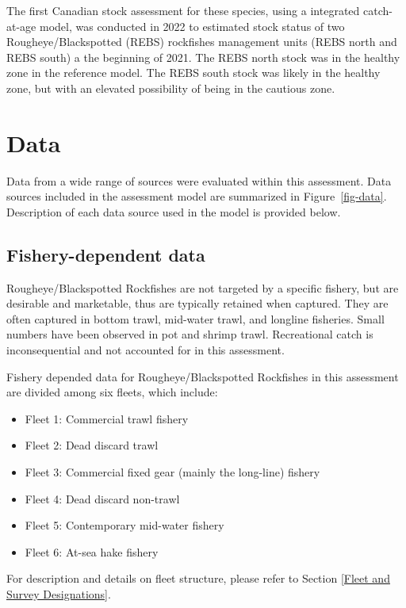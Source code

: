 \documentclass[
]{scrartcl}
\providecommand{\tightlist}{%
  \setlength{\itemsep}{0pt}\setlength{\parskip}{0pt}}\usepackage{longtable,booktabs,array}
\begin{document}
The first Canadian stock assessment for these species, using a
integrated catch-at-age model, was conducted in 2022 to estimated stock
status of two Rougheye/Blackspotted (REBS) rockfishes management units
(REBS north and REBS south) a the beginning of 2021. The REBS north
stock was in the healthy zone in the reference model. The REBS south
stock was likely in the healthy zone, but with an elevated possibility
of being in the cautious zone.

\newpage{}

\section{Data}\label{data}

Data from a wide range of sources were evaluated within this assessment.
Data sources included in the assessment model are summarized in
Figure~\ref{fig-data}. Description of each data source used in the model
is provided below.

\subsection{Fishery-dependent data}\label{fishery-dependent-data}

Rougheye/Blackspotted Rockfishes are not targeted by a specific fishery,
but are desirable and marketable, thus are typically retained when
captured. They are often captured in bottom trawl, mid-water trawl, and
longline fisheries. Small numbers have been observed in pot and shrimp
trawl. Recreational catch is inconsequential and not accounted for in
this assessment.

Fishery depended data for Rougheye/Blackspotted Rockfishes in this
assessment are divided among six fleets, which include:

\begin{itemize}
\tightlist
\item
  Fleet 1: Commercial trawl fishery
\item
  Fleet 2: Dead discard trawl
\item
  Fleet 3: Commercial fixed gear (mainly the long-line) fishery
\item
  Fleet 4: Dead discard non-trawl
\item
  Fleet 5: Contemporary mid-water fishery
\item
  Fleet 6: At-sea hake fishery
\end{itemize}

For description and details on fleet structure, please refer to Section
\ref{Fleet and Survey Designations}.
\end{document}
